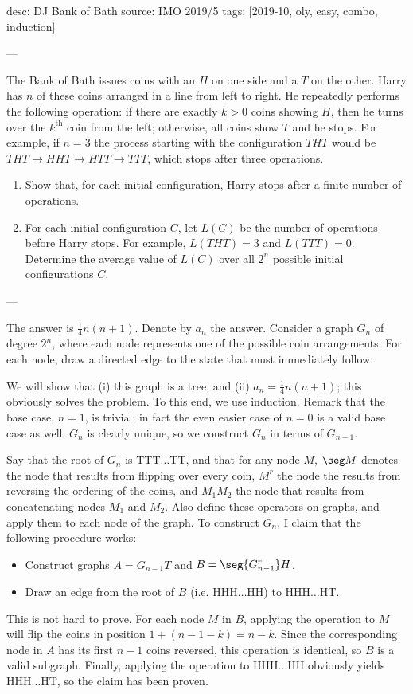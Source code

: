 desc: DJ Bank of Bath
source: IMO 2019/5
tags: [2019-10, oly, easy, combo, induction]

---

The Bank of Bath issues coins with an $H$ on one side and a $T$ on the other. Harry has $n$ of these coins arranged in a line from left to right. He repeatedly performs the following operation: if there are exactly $k>0$ coins showing $H$, then he turns over the $k^\text{th}$ coin from the left; otherwise, all coins show $T$ and he stops. For example, if $n=3$ the process starting with the configuration $THT$ would be $THT\to HHT\to HTT\to TTT$, which stops after three operations.
\begin{enumerate}[label=(\alph*)]
    \item Show that, for each initial configuration, Harry stops after a finite number of operations.
    \item For each initial configuration $C$, let $L(C)$ be the number of operations before Harry stops. For example, $L(THT)=3$ and $L(TTT)=0$. Determine the average value of $L(C)$ over all $2^n$ possible initial configurations $C$.
\end{enumerate}

---

The answer is $\tfrac14n(n+1)$. Denote by $a_n$ the answer. Consider a graph $G_n$ of degree $2^n$, where each node represents one of the possible coin arrangements. For each node, draw a directed edge to the state that must immediately follow.

We will show that (i) this graph is a tree, and (ii) $a_n=\tfrac14n(n+1)$; this obviously solves the problem. To this end, we use induction. Remark that the base case, $n=1$, is trivial; in fact the even easier case of $n=0$ is a valid base case as well. $G_n$ is clearly unique, so we construct $G_n$ in terms of $G_{n-1}$.

Say that the root of $G_n$ is $\text{TTT}\ldots\text{TT}$, and that for any node $M$, $\seg M$ denotes the node that results from flipping over every coin, $M^r$ the node the results from reversing the ordering of the coins, and $M_1M_2$ the node that results from concatenating nodes $M_1$ and $M_2$. Also define these operators on graphs, and apply them to each node of the graph. To construct $G_n$, I claim that the following procedure works:
\begin{itemize}
    \item Construct graphs $A=G_{n-1}T$ and $B=\seg{G_{n-1}^r}H$.
        \vspace{-0.5em}
    \item Draw an edge from the root of $B$ (i.e. $\text{HHH}\ldots\text{HH}$) to $\text{HHH}\ldots\text{HT}$.
\end{itemize}
This is not hard to prove. For each node $M$ in $B$, applying the operation to $M$ will flip the coins in position $1+(n-1-k)=n-k$. Since the corresponding node in $A$ has its first $n-1$ coins reversed, this operation is identical, so $B$ is a valid subgraph. Finally, applying the operation to $\text{HHH}\ldots\text{HH}$ obviously yields $\text{HHH}\ldots\text{HT}$, so the claim has been proven.

